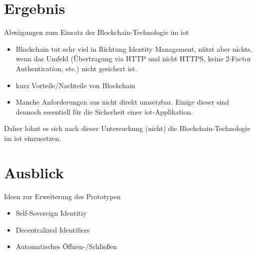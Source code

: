 \section{Ergebnis}
\label{sec:end}
    Abwägungen zum Einsatz der Blockchain-Technologie im \gls{iot}
    
    \begin{itemize}
        \item Blockchain tut sehr viel in Richtung Identity Management, nützt aber nichts, wenn das Umfeld (Übertragung via HTTP und nicht HTTPS, keine 2-Factor Authentication, etc.) nicht gesichert ist.
        \item kurz Vorteile/Nachteile von Blockchain
        \item Manche Anforderungen aus  nicht direkt umsetzbar.
            Einige dieser sind dennoch essentiell für die Sicherheit einer \gls{iot}-Applikation.
    \end{itemize}
    
    Daher lohnt es sich nach dieser Untersuchung (nicht) die Blockchain-Technologie im \gls{iot} einzusetzen.
    
    
\section{Ausblick}
\label{sec:end_further}
	Ideen zur Erweiterung des Prototypen
	\begin{itemize}
		\item Self-Sovereign Identitiy
		\item Decentralized Identifiers
		\item Automatisches Öffnen-/\-Schließen
	\end{itemize}